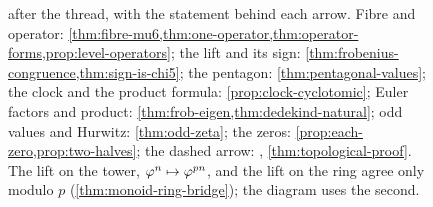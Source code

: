 \begin{figure}[ht]
\centering\footnotesize
{}
\caption{ after the thread, with the statement behind each arrow.  Fibre and operator:
\cref{thm:fibre-mu6,thm:one-operator,thm:operator-forms,prop:level-operators}; the lift and its sign: \cref{thm:frobenius-congruence,thm:sign-is-chi5};
the pentagon: \cref{thm:pentagonal-values}; the clock and the product formula: \cref{prop:clock-cyclotomic};
Euler factors and product: \cref{thm:frob-eigen,thm:dedekind-natural}; odd values and Hurwitz: \cref{thm:odd-zeta};
the zeros: \cref{prop:each-zero,prop:two-halves}; the dashed arrow: \Ecore, \cref{thm:topological-proof}.  The
lift on the tower, $\varphi^n\mapsto\varphi^{pn}$, and the lift on the ring agree only modulo $p$
(\cref{thm:monoid-ring-bridge}); the diagram uses the second.}
\label{fig:construction-formulas}
\end{figure}



